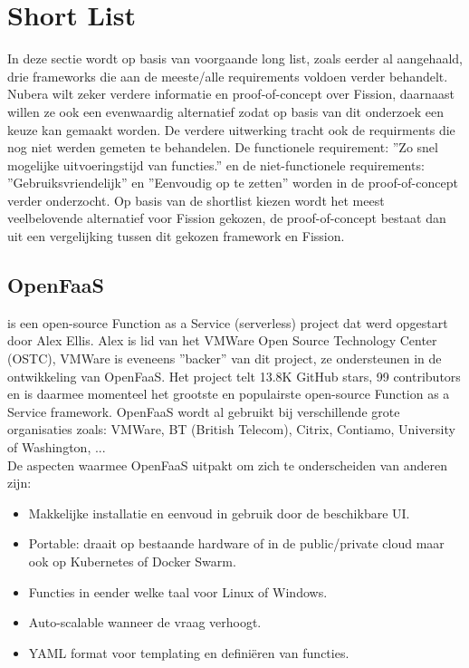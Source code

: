 \section{Short List}
\label{sec:short-list}

In deze sectie wordt op basis van voorgaande long list, zoals eerder al aangehaald, drie frameworks die aan de meeste/alle requirements voldoen verder behandelt. Nubera wilt zeker verdere informatie en proof-of-concept over Fission, daarnaast willen ze ook een evenwaardig alternatief zodat op basis van dit onderzoek een keuze kan gemaakt worden. De verdere uitwerking tracht ook de requirments die nog niet werden gemeten te behandelen. De functionele requirement: ''Zo snel mogelijke uitvoeringstijd van functies.'' en de niet-functionele requirements: ''Gebruiksvriendelijk'' en ''Eenvoudig op te zetten'' worden in de proof-of-concept verder onderzocht. Op basis van de shortlist kiezen wordt het meest veelbelovende alternatief voor Fission gekozen, de proof-of-concept bestaat dan uit een vergelijking tussen dit gekozen framework en Fission.


\subsection{OpenFaaS}
\textcite{OpenFaaS2019} is een open-source Function as a Service (serverless) project dat werd opgestart door Alex Ellis. Alex is lid van het VMWare Open Source Technology Center (OSTC), VMWare is eveneens ''backer'' van dit project, ze ondersteunen in de ontwikkeling van OpenFaaS. Het project telt 13.8K GitHub stars, 99 contributors en is daarmee momenteel het grootste en populairste open-source Function as a Service framework. OpenFaaS wordt al gebruikt bij verschillende grote organisaties zoals: VMWare, BT (British Telecom), Citrix, Contiamo, University of Washington, ... 
\\
De aspecten waarmee OpenFaaS uitpakt om zich te onderscheiden van anderen zijn:
\begin{itemize}
    \item Makkelijke installatie en eenvoud in gebruik door de beschikbare UI.
    \item Portable: draait op bestaande hardware of in de public/private cloud maar ook op Kubernetes of Docker Swarm.
    \item Functies in eender welke taal voor Linux of Windows.
    \item Auto-scalable wanneer de vraag verhoogt.
    \item YAML format voor templating en definiëren van functies.
\end{itemize}
